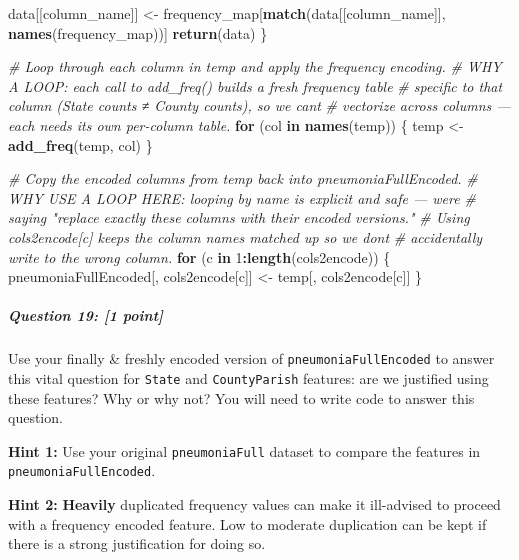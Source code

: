 \documentclass[
]{article}
\newenvironment{Shaded}{\begin{snugshade}}{\end{snugshade}}
\newcommand{\CommentTok}[1]{\textcolor[rgb]{0.56,0.35,0.01}{\textit{#1}}}
\newcommand{\ControlFlowTok}[1]{\textcolor[rgb]{0.13,0.29,0.53}{\textbf{#1}}}
\newcommand{\DecValTok}[1]{\textcolor[rgb]{0.00,0.00,0.81}{#1}}
\newcommand{\FunctionTok}[1]{\textcolor[rgb]{0.13,0.29,0.53}{\textbf{#1}}}
\newcommand{\NormalTok}[1]{#1}
\newcommand{\OtherTok}[1]{\textcolor[rgb]{0.56,0.35,0.01}{#1}}
\newcommand{\SpecialCharTok}[1]{\textcolor[rgb]{0.81,0.36,0.00}{\textbf{#1}}}
\begin{document}
\begin{Shaded}
\begin{Highlighting}[]
\NormalTok{  data[[column\_name]] }\OtherTok{\textless{}{-}}\NormalTok{ frequency\_map[}\FunctionTok{match}\NormalTok{(data[[column\_name]],}
                                             \FunctionTok{names}\NormalTok{(frequency\_map))]}
  \FunctionTok{return}\NormalTok{(data)}
\NormalTok{\}}

\CommentTok{\# Loop through each column in temp and apply the frequency encoding.}
\CommentTok{\# WHY A LOOP: each call to add\_freq() builds a fresh frequency table }
\CommentTok{\# specific to that column (State counts ≠ County counts), so we can\textquotesingle{}t }
\CommentTok{\# vectorize across columns — each needs its own per{-}column table.}
\ControlFlowTok{for}\NormalTok{ (col }\ControlFlowTok{in} \FunctionTok{names}\NormalTok{(temp)) \{}
\NormalTok{  temp }\OtherTok{\textless{}{-}} \FunctionTok{add\_freq}\NormalTok{(temp, col)}
\NormalTok{\}}

\CommentTok{\# Copy the encoded columns from temp back into pneumoniaFullEncoded.}
\CommentTok{\# WHY USE A LOOP HERE: looping by name is explicit and safe — we\textquotesingle{}re }
\CommentTok{\# saying "replace exactly these columns with their encoded versions."}
\CommentTok{\# Using cols2encode[c] keeps the column names matched up so we don\textquotesingle{}t }
\CommentTok{\# accidentally write to the wrong column.}
\ControlFlowTok{for}\NormalTok{ (c }\ControlFlowTok{in} \DecValTok{1}\SpecialCharTok{:}\FunctionTok{length}\NormalTok{(cols2encode)) \{}
\NormalTok{  pneumoniaFullEncoded[, cols2encode[c]] }\OtherTok{\textless{}{-}}\NormalTok{ temp[, cols2encode[c]]}
\NormalTok{\}}
\end{Highlighting}
\end{Shaded}

\subparagraph{\texorpdfstring{\textbf{Question 19}: {[}1
point{]}}{Question 19: {[}1 point{]}}}\label{question-19-1-point}

Use your finally \& freshly encoded version of
\texttt{pneumoniaFullEncoded} to answer this vital question for
\texttt{State} and \texttt{CountyParish} features: are we justified
using these features? Why or why not? You will need to write code to
answer this question.

\textbf{Hint 1: }Use your original \texttt{pneumoniaFull} dataset to
compare the features in \texttt{pneumoniaFullEncoded}.

\textbf{Hint 2: } \textbf{Heavily} duplicated frequency values can make
it ill-advised to proceed with a frequency encoded feature. Low to
moderate duplication can be kept if there is a strong justification for
doing so.
\end{document}
